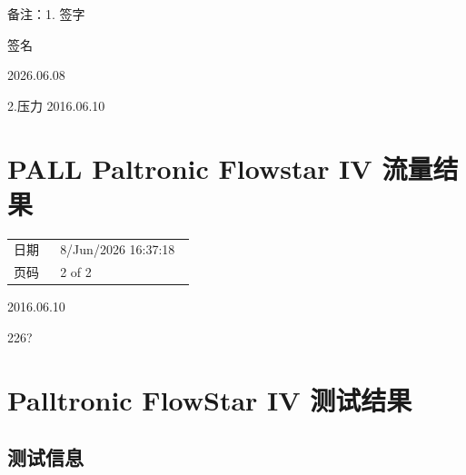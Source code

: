 \documentclass[UTF8,10pt,a4paper,fontset=fandol]{ctexart}
\newcommand{\fieldvalue}[1]{#1}
\newcommand{\handwritten}[1]{#1}
\begin{document}
\vspace{1em}

备注：1. 签字

\fieldvalue{\handwritten{签名}}

\fieldvalue{\handwritten{2026.06.08}}

\handwritten{2.压力 2016.06.10}

\section*{PALL Paltronic Flowstar IV 流量结果}

\begin{tabular}{@{}p{0.24\linewidth}p{0.70\linewidth}@{}}
日期 &
\fieldvalue{8/Jun/2026 16:37:18}
\\
页码 &
\fieldvalue{2 of 2}
\\
\end{tabular}

\vspace{1em}

\begin{center}
\end{center}

\handwritten{2016.06.10}

\handwritten{226?}

\newpage

\section*{Palltronic FlowStar IV 测试结果}

\subsection*{测试信息}
\end{document}
